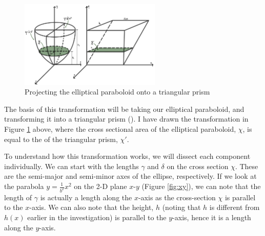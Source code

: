 \documentclass[12pt]{article}
\begin{document}
\begin{figure}[h]
    \centering
        \includegraphics[width=0.6\textwidth]{more images/cava baby.jpg}
        \caption{Projecting the elliptical paraboloid onto a triangular prism}
        \label{fig:cava}
    \hfill
\end{figure}

The basis of this transformation will be taking our elliptical paraboloid, and transforming it into a triangular prism (\citeauthor{bogomolny}). I have drawn the transformation in Figure \ref{fig:cava} above, where the cross sectional area of the elliptical paraboloid, $\chi$, is equal to the of the triangular prism, $\chi '$.

To understand how this transformation works, we will dissect each component individually. We can start with the lengths $\gamma$ and $\delta$ on the cross section $\chi$. These are the semi-major and semi-minor axes of the ellipse, respectively. If we look at the parabola $y=\frac{1}{b^2}x^2$ on the 2-D plane $x$-$y$ (Figure \ref{fig:xy}), we can note that the length of $\gamma$ is actually a length along the $x$-axis as the cross-section $\chi$ is parallel to the $x$-axis. We can also note that the height, $h$ (noting that $h$ is different from $h(x)$ earlier in the investigation) is parallel to the $y$-axis, hence it is a length along the $y$-axis. 
\end{document}
